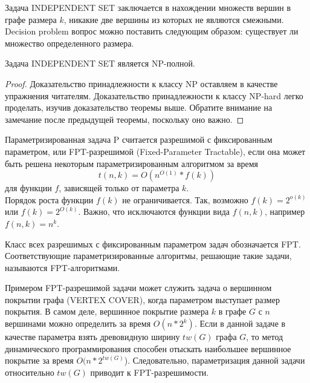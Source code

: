     \begin{Def}
        Задача INDEPENDENT SET заключается в нахождении множеств  вершин в графе размера $k$, никакие две вершины из которых не являются смежными. Decision problem вопрос можно поставить следующим образом: существует ли множество определенного размера.
    \end{Def}
    \begin{Thm}
        Задача INDEPENDENT SET является NP-полной. 
    \end{Thm}
    \begin{proof}
        Доказательство принадлежности к классу NP оставляем в качестве упражнения читателям. Доказательство принадлежности к классу NP-hard легко проделать, изучив доказательство теоремы выше. Обратите внимание на замечание после предыдущей теоремы, поскольку оно важно.
    \end{proof}
    
    
    \begin{Def}
        Параметризированная задача P считается разрешимой с фиксированным параметром, или FPT-разрешимой (Fixed-Parameter Tractable), если она может быть решена некоторым параметризированным алгоритмом за время
        $$t(n, k) = O(n^{O(1)} * f(k))$$
        для функции $f$, зависящей только от параметра $k$.\\ 
        Порядок роста функции $f(k)$ не ограничивается. Так, возможно $f(k) = 2^{o(k)}$ или $f(k) = 2^{O(k)}$. Важно, что исключаются функции вида $f(n, k)$, например $f(n, k) = n^k$.
    \end{Def}
    \begin{Rem}
        Класс всех разрешимых с фиксированным параметром задач обозначается FPT. Соответствующие параметризированные алгоритмы, решающие такие задачи, называются FPT-алгоритмами.
    \end{Rem}
    \begin{Example}
        Примером FPT-разрешимой задачи может служить задача о вершинном покрытии графа (VERTEX COVER), когда параметром выступает размер покрытия. В самом деле, вершинное покрытие размера $k$ в графе $G$ с $n$ вершинами можно определить за время $O(n*2^k)$. Если в данной задаче в качестве параметра взять древовидную ширину $tw(G)$ графа $G$, то метод динамического программирования способен отыскать наибольшее вершинное покрытие за время $O(n * 2^{tw(G)}$). Следовательно, параметризация данной задачи относительно $tw(G)$ приводит к FPT-разрешимости.
    \end{Example}

